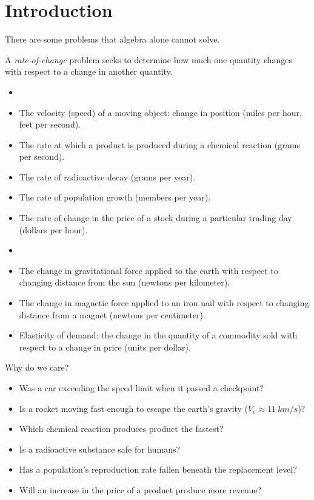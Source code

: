\documentclass[letterpaper,12pt,fleqn]{article}
\begin{document}
\section*{Introduction}

There are some problems that algebra alone cannot solve.

\begin{definition}
  A \emph{rate-of-change} problem seeks to determine how much one quantity changes with respect to a change in
  another quantity.
\end{definition}

\begin{examples}
  \begin{itemize}[left=0in]
  \item[]
  \item The velocity (speed) of a moving object: change in position (miles per hour, feet per second).
  \item The rate at which a product is produced during a chemical reaction (grams per second).
  \item The rate of radioactive decay (grams per year).
  \item The rate of population growth (members per year).
  \item The rate of change in the price of a stock during a particular trading day (dollars per hour).
  \end{itemize}
\end{examples}

\begin{examples}
  \begin{itemize}[left=0in]
  \item[]
  \item The change in gravitational force applied to the earth with respect to changing distance from the sun
    (newtons per kilometer).
  \item The change in magnetic force applied to an iron nail with respect to changing distance from a magnet
    (newtons per centimeter).
  \item Elasticity of demand: the change in the quantity of a commodity sold with respect to a change in price
    (units per dollar).
  \end{itemize}
\end{examples}

Why do we care?
\begin{itemize}[left=0in]
\item Was a car exceeding the speed limit when it passed a checkpoint?
\item Is a rocket moving fast enough to escape the earth's gravity (\(V_e\approx\SI{11}{km/s}\))?
\item Which chemical reaction produces product the fastest?
\item Is a radioactive substance safe for humans?
\item Has a population's reproduction rate fallen beneath the replacement level?
\item Will an increase in the price of a product produce more revenue?
\end{itemize}
\end{document}

